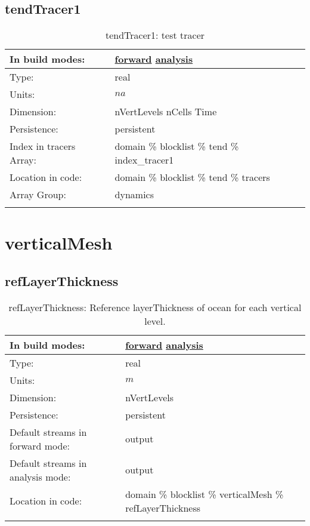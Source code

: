 \subsection[tendTracer1]{tendTracer1}
\label{subsec:var_sec_tend_tendTracer1}
\begin{center}
\begin{longtable}{| p{2.0in} | p{4.0in} |}
        \hline 
        In build modes: & \hyperref[subsec:forward_var_tab_tend]{forward} \hyperref[subsec:analysis_var_tab_tend]{analysis} \\
        \hline 
        Type: & real \\
        \hline 
        Units: & $na$ \\
        \hline 
        Dimension: & nVertLevels nCells Time \\
        \hline 
        Persistence: & persistent \\
        \hline 
		 Index in tracers Array: & domain \% blocklist \% tend \% index\_tracer1 \\
		 \hline 
		 Location in code: & domain \% blocklist \% tend \% tracers \\
		 \hline 
		 Array Group: & dynamics \\
		 \hline 
    \caption{tendTracer1: test tracer}
\end{longtable}
\end{center}
\section[verticalMesh]{verticalMesh}
\label{sec:var_sec_verticalMesh}
\subsection[refLayerThickness]{refLayerThickness}
\label{subsec:var_sec_verticalMesh_refLayerThickness}
\begin{center}
\begin{longtable}{| p{2.0in} | p{4.0in} |}
        \hline 
        In build modes: & \hyperref[subsec:forward_var_tab_verticalMesh]{forward} \hyperref[subsec:analysis_var_tab_verticalMesh]{analysis} \\
        \hline 
        Type: & real \\
        \hline 
        Units: & $m$ \\
        \hline 
        Dimension: & nVertLevels \\
        \hline 
        Persistence: & persistent \\
        \hline 
		 Default streams in forward mode: &  output \\
        \hline 
		 Default streams in analysis mode: &  output \\
        \hline 
		 Location in code: & domain \% blocklist \% verticalMesh \% refLayerThickness \\
		 \hline 
    \caption{refLayerThickness: Reference layerThickness of ocean for each vertical level.}
\end{longtable}
\end{center}
